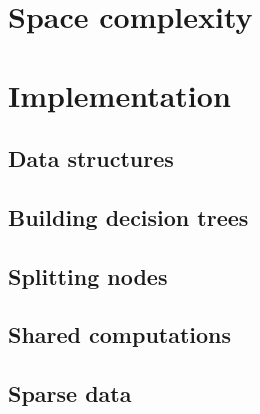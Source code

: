 

\section{Space complexity}
\label{sec:5:space}


\section{Implementation}
\label{sec:5:impl}


\subsection{Data structures}


\subsection{Building decision trees}


\subsection{Splitting nodes}


\subsection{Shared computations}


\subsection{Sparse data}


